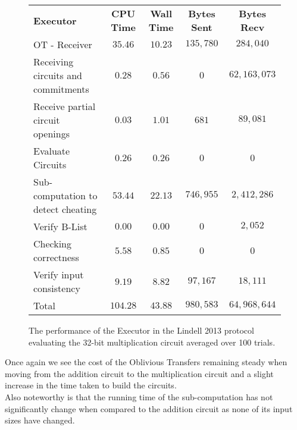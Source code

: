 \documentclass[ %
                    author={Nicholas Tutte},
                supervisor={Prof. Nigel Smart},
                    degree={MEng},
                     title={Secure Two Party Computation},
                  subtitle={A practical comparison of recent protocols},
                      type={Research - GG1K},
                      year={2015} ]{dissertation}
\begin{document}
				\begin{figure}[!ht]
					\begin{tabular}{| p{4.3cm} | c c c c |}
						\hline
						\textbf{Executor} & \textbf{CPU Time} & \textbf{Wall Time} & \textbf{Bytes Sent} & \textbf{Bytes Recv} \\
						\thickhline
						OT - Receiver & $35.46$ & $10.23$ & $135,780$ & $284,040$ \\
						\hline
						Receiving circuits and commitments & $0.28$ & $0.56$ & $0$ & $62,163,073$ \\
						\hline
						Receive partial circuit openings & $0.03$ & $1.01$ & $681$ & $89,081$ \\
						\hline
						Evaluate Circuits & $0.26$ & $0.26$ & $0$ & $0$ \\
						\hline
						Sub-computation to detect cheating & $53.44$ & $22.13$ & $746,955$ & $2,412,286$ \\
						\hline
						Verify B-List & $0.00$ & $0.00$ & $0$ & $2,052$ \\
						\hline
						Checking correctness & $5.58$ & $0.85$ & $0$ & $0$ \\
						\hline
						Verify input consistency & $9.19$ & $8.82$ & $97,167$ & $18,111$ \\
						\thickhline
						Total & $104.28$ & $43.88$ & $980,583$ & $64,968,644$ \\
						\hline
					\end{tabular}
					\caption{The performance of the Executor in the Lindell 2013 protocol evaluating the 32-bit multiplication circuit averaged over 100 trials.\label{table:L_2013_Mul_Executor} }
				\end{figure}
				\FloatBarrier

				Once again we see the cost of the Oblivious Transfers remaining steady when moving from the addition circuit to the multiplication circuit and a slight increase in the time taken to build the circuits.\\

				Also noteworthy is that the running time of the sub-computation has not significantly change when compared to the addition circuit as none of its input sizes have changed.\\
\end{document}
